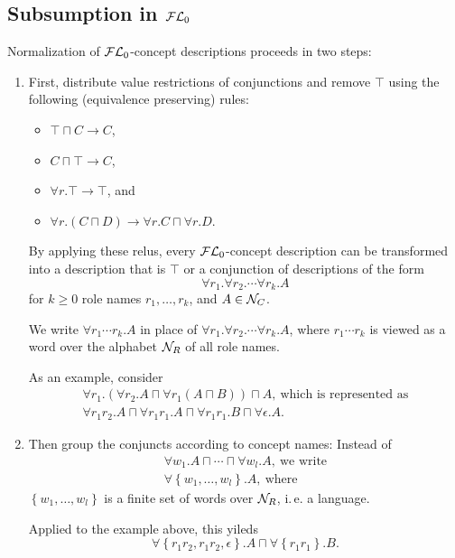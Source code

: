 \documentclass[openany]{scrbook}
\theoremstyle{break}
\theoremstyle{nonumberbreak}
\theoremstyle{nonumberplain}
\theoremstyle{nonumberbreak}
\newcommand{\set}[1]{\left\{#1\right\}}
\newcommand{\ie}{i{.}\,e{.}\xspace}
\newcommand{\FLz}{{\cal F}{\cal L}_0}
\begin{document}
\subsection{Subsumption in $\FLz$}
Normalization of $\FLz$-concept descriptions proceeds in two steps:
\begin{enumerate}
\item First, distribute value restrictions of conjunctions and remove $\top$
  using the following (equivalence preserving) rules:
  \begin{itemize}
  \item $\top \sqcap C \to C$,
  \item $C \sqcap \top \to C$,
  \item $\forall r.\top \to \top$, and
  \item $\forall r.(C \sqcap D) \to \forall r.C \sqcap \forall r.D$.
  \end{itemize}

  By applying these relus, every $\FLz$-concept description can be
  transformed into a description that is $\top$ or a conjunction of
  descriptions of the form
  \begin{equation*}
    \forall r_1. \forall r_2. \dotsm \forall r_k.A
  \end{equation*}
  for $k \geq 0$ role names $r_1, \dotsc, r_k$, and $A \in {\cal
    N}_C$.

  We write $\forall r_1 \dotsm r_k.A$ in place of $\forall r_1.\forall
  r_2. \dotsm \forall r_k.A$, where $r_1 \dotsm r_k$ is viewed as a
  word over the alphabet ${\cal N}_R$ of all role names.

  As an example, consider
  \begin{align*}
    \forall r_1.\left(\forall r_2. A \sqcap \forall r_1 \left(A \sqcap
      B\right)\right) \sqcap A,\ \text{which is represented as} \\
  \forall r_1 r_2. A \sqcap \forall r_1 r_1. A \sqcap \forall
  r_1r_1. B \sqcap \forall \epsilon.A.
  \end{align*}
\item Then group the conjuncts according to concept names: Instead of
  \begin{align*}
    \forall w_1.A \sqcap \dotsb \sqcap \forall w_l.A,\ \text{we write} \\
    \forall \set{w_1, \dotsc, w_l}.A,\ \text{where}
  \end{align*}
  $\set{w_1, \dotsc, w_l}$ is a finite set of words over ${\cal N}_R$,
  \ie a language.

  Applied to the example above, this yileds
  \begin{equation*}
    \forall \set{r_1r_2, r_1r_2, \epsilon}. A \sqcap \forall \set{r_1r_1}.B.
  \end{equation*}
\end{enumerate}
\end{document}
